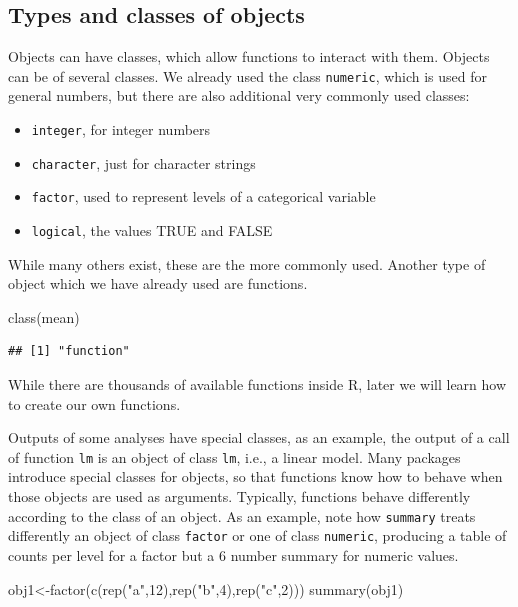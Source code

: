 \documentclass[
]{article}
\newenvironment{Shaded}{\begin{snugshade}}{\end{snugshade}}
\newcommand{\DecValTok}[1]{\textcolor[rgb]{0.00,0.00,0.81}{#1}}
\newcommand{\FunctionTok}[1]{\textcolor[rgb]{0.00,0.00,0.00}{#1}}
\newcommand{\NormalTok}[1]{#1}
\newcommand{\OtherTok}[1]{\textcolor[rgb]{0.56,0.35,0.01}{#1}}
\newcommand{\StringTok}[1]{\textcolor[rgb]{0.31,0.60,0.02}{#1}}
\providecommand{\tightlist}{%
  \setlength{\itemsep}{0pt}\setlength{\parskip}{0pt}}
\begin{document}
\hypertarget{types-and-classes-of-objects}{%
\subsection{Types and classes of
objects}\label{types-and-classes-of-objects}}

Objects can have classes, which allow functions to interact with them.
Objects can be of several classes. We already used the class
\texttt{numeric}, which is used for general numbers, but there are also
additional very commonly used classes:

\begin{itemize}
\tightlist
\item
  \texttt{integer}, for integer numbers
\item
  \texttt{character}, just for character strings
\item
  \texttt{factor}, used to represent levels of a categorical variable
\item
  \texttt{logical}, the values TRUE and FALSE
\end{itemize}

While many others exist, these are the more commonly used. Another type
of object which we have already used are functions.

\begin{Shaded}
\begin{Highlighting}[]
\FunctionTok{class}\NormalTok{(mean)}
\end{Highlighting}
\end{Shaded}

\begin{verbatim}
## [1] "function"
\end{verbatim}

While there are thousands of available functions inside R, later we will
learn how to create our own functions.

Outputs of some analyses have special classes, as an example, the output
of a call of function \texttt{lm} is an object of class \texttt{lm},
i.e., a linear model. Many packages introduce special classes for
objects, so that functions know how to behave when those objects are
used as arguments. Typically, functions behave differently according to
the class of an object. As an example, note how \texttt{summary} treats
differently an object of class \texttt{factor} or one of class
\texttt{numeric}, producing a table of counts per level for a factor but
a 6 number summary for numeric values.

\begin{Shaded}
\begin{Highlighting}[]
\NormalTok{obj1}\OtherTok{\textless{}{-}}\FunctionTok{factor}\NormalTok{(}\FunctionTok{c}\NormalTok{(}\FunctionTok{rep}\NormalTok{(}\StringTok{"a"}\NormalTok{,}\DecValTok{12}\NormalTok{),}\FunctionTok{rep}\NormalTok{(}\StringTok{"b"}\NormalTok{,}\DecValTok{4}\NormalTok{),}\FunctionTok{rep}\NormalTok{(}\StringTok{"c"}\NormalTok{,}\DecValTok{2}\NormalTok{)))}
\FunctionTok{summary}\NormalTok{(obj1)}
\end{Highlighting}
\end{Shaded}
\end{document}
